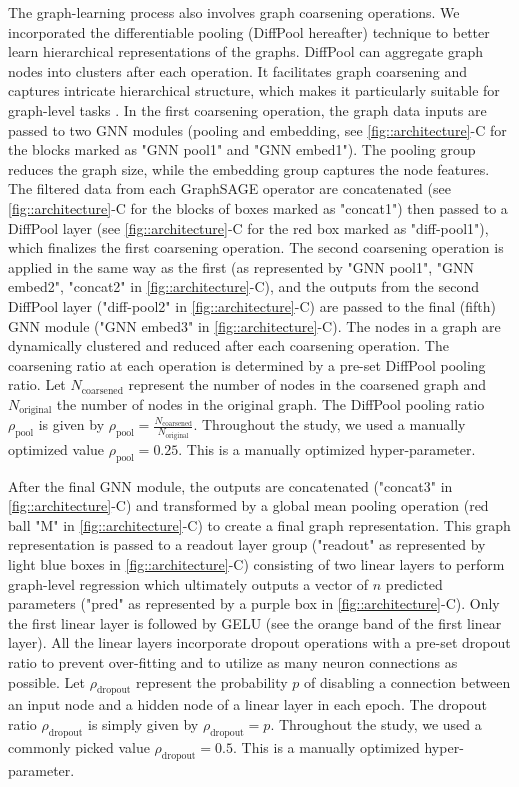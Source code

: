 {The graph-learning process also involves graph coarsening operations. We incorporated the differentiable pooling (DiffPool hereafter) technique to better learn hierarchical representations of the graphs. DiffPool can aggregate graph nodes into clusters after each operation. It facilitates graph coarsening and captures intricate hierarchical structure, which makes it particularly suitable for graph-level tasks \citep{ying_hierarchical_2018}. In the first coarsening operation, the graph data inputs are passed to two GNN modules (pooling and embedding, see \autoref{fig::architecture}-C for the blocks marked as "GNN pool1" and "GNN embed1"). The pooling group reduces the graph size, while the embedding group captures the node features. The filtered data from each GraphSAGE operator are concatenated (see \autoref{fig::architecture}-C for the blocks of boxes marked as "concat1") then passed to a DiffPool layer (see \autoref{fig::architecture}-C for the red box marked as "diff-pool1"), which finalizes the first coarsening operation. The second coarsening operation is applied in the same way as the first (as represented by "GNN pool1", "GNN embed2", "concat2" in \autoref{fig::architecture}-C), and the outputs from the second DiffPool layer ("diff-pool2" in \autoref{fig::architecture}-C) are passed to the final (fifth) GNN module ("GNN embed3" in \autoref{fig::architecture}-C). The nodes in a graph are dynamically clustered and reduced after each coarsening operation. The coarsening ratio at each operation is determined by a pre-set DiffPool pooling ratio. Let $N_{\text{coarsened}}$ represent the number of nodes in the coarsened graph and $N_{\text{original}}$ the number of nodes in the original graph. The DiffPool pooling ratio $\rho_{\text{pool}}$ is given by $\rho_{\text{pool}} = \frac{N_{\text{coarsened}}}{N_{\text{original}}}$. Throughout the study, we used a manually optimized value $\rho_{\text{pool}}=0.25$. This is a manually optimized hyper-parameter.

After the final GNN module, the outputs are concatenated ("concat3" in \autoref{fig::architecture}-C) and transformed by a global mean pooling operation (red ball "M" in \autoref{fig::architecture}-C) to create a final graph representation. This graph representation is passed to a readout layer group ("readout" as represented by light blue boxes in \autoref{fig::architecture}-C) consisting of two linear layers to perform graph-level regression which ultimately outputs a vector of $n$ predicted parameters ("pred" as represented by a purple box in \autoref{fig::architecture}-C). Only the first linear layer is followed by GELU (see the orange band of the first linear layer). All the linear layers incorporate dropout operations with a pre-set dropout ratio to prevent over-fitting and to utilize as many neuron connections as possible. Let $\rho_{\text{dropout}}$ represent the probability $p$ of disabling a connection between an input node and a hidden node of a linear layer in each epoch. The dropout ratio $\rho_{\text{dropout}}$ is simply given by $\rho_{\text{dropout}} = p$. Throughout the study, we used a commonly picked value $\rho_{\text{dropout}} = 0.5$. This is a manually optimized hyper-parameter. 

}
